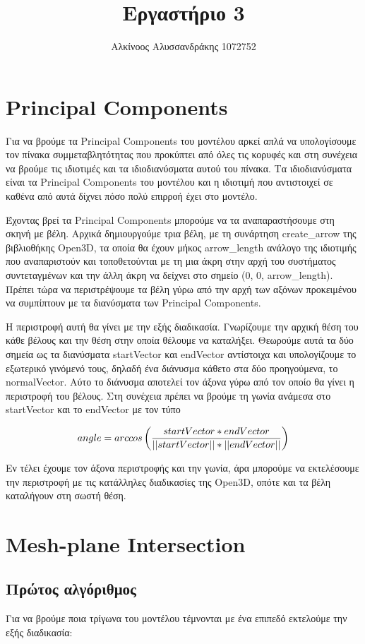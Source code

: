 \documentclass{article}
\title{Εργαστήριο 3}
\author{Αλκίνοος Αλυσσανδράκης 1072752}
\date{}
\begin{document}
\maketitle

\section{Principal Components}
Για να βρούμε τα Principal Components του μοντέλου αρκεί απλά να υπολογίσουμε τον πίνακα
συμμεταβλητότητας που προκύπτει από όλες τις κορυφές και στη συνέχεια να βρούμε τις
ιδιοτιμές και τα ιδιοδιανύσματα αυτού του πίνακα. Τα ιδιοδιανύσματα είναι τα Principal
Components του μοντέλου και η ιδιοτιμή που αντιστοιχεί σε καθένα από αυτά δίχνει πόσο
πολύ επιρροή έχει στο μοντέλο.

Έχοντας βρεί τα Principal Components μπορούμε να τα αναπαραστήσουμε στη σκηνή με βέλη.
Αρχικά δημιουργούμε τρια βέλη, με τη συνάρτηση create\_arrow της βιβλιοθήκης Open3D, τα
οποία θα έχουν μήκος arrow\_length ανάλογο της ιδιοτιμής που αναπαριστούν και
τοποθετούνται με τη μια άκρη στην αρχή του συστήματος συντεταγμένων και την άλλη
άκρη να δείχνει στο σημείο (0, 0, arrow\_length).
Πρέπει τώρα να περιστρέψουμε τα βέλη γύρω από την αρχή των αξόνων προκειμένου να
συμπίπτουν με τα διανύσματα των Principal Components.

Η περιστροφή αυτή θα γίνει με την εξής διαδικασία. Γνωρίζουμε την αρχική θέση του κάθε
βέλους και την θέση στην οποία θέλουμε να καταλήξει. Θεωρούμε αυτά τα δύο σημεία ως τα
διανύσματα startVector και endVector αντίστοιχα και υπολογίζουμε το εξωτερικό γινόμενό
τους, δηλαδή ένα διάνυσμα κάθετο στα δύο προηγούμενα, το normalVector.
Αύτο το διάνυσμα αποτελεί τον άξονα γύρω από τον οποίο θα γίνει η περιστροφή του βέλους.
Στη συνέχεια πρέπει να βρούμε τη γωνία ανάμεσα στο startVector και το endVector
με τον τύπο

\[
	angle = arccos\left({startVector*endVector \over ||startVector||*||endVector||}\right)
\]

Εν τέλει έχουμε τον άξονα περιστροφής και την γωνία, άρα μπορούμε να εκτελέσουμε την
περιστροφή με τις κατάλληλες διαδικασίες της Open3D, οπότε και τα βέλη καταλήγουν στη
σωστή θέση.


\section{Mesh-plane Intersection}

\subsection{Πρώτος αλγόριθμος}
Για να βρούμε ποια τρίγωνα του μοντέλου τέμνονται με ένα επιπεδό εκτελούμε την εξής
διαδικασία:
\end{document}
